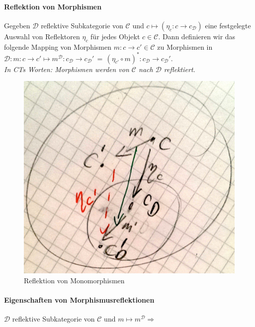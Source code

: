  
\paragraph{ Reflektion von Morphismen}  
Gegeben $\mathcal{D}$ reflektive Subkategorie von $\mathcal{C}$ und $c \mapsto (\eta_c : c \rightarrow c_\mathcal{D})$ eine festgelegte Auswahl von Reflektoren $\eta_c$ für jedes Objekt $c \in \mathcal{C}$.
Dann definieren wir das folgende Mapping von Morphismen $m: c \rightarrow c' \in \mathcal{C}$ zu Morphismen in $\mathcal{D}: m : c \rightarrow c' \mapsto m^\mathcal{D}: c_\mathcal{D} \rightarrow c_\mathcal{D}' \, = \, (\eta_{c'} \circ m)^* : c_\mathcal{D} \rightarrow c_\mathcal{D}'$.  \\
\emph{In CTs Worten: Morphismen werden von $\mathcal{C}$ nach $\mathcal{D}$ reflektiert.}

\begin{figure}[h]
\noindent \centering{}\includegraphics[scale=0.09]{Abbildungen/160}\caption{Reflektion von Monomorphismen}
\end{figure}

\paragraph{ Eigenschaften von Morphismusreflektionen}  
$\mathcal{D}$ reflektive Subkategorie von $\mathcal{C}$ und $m \mapsto m^\mathcal{D} \Rightarrow$

